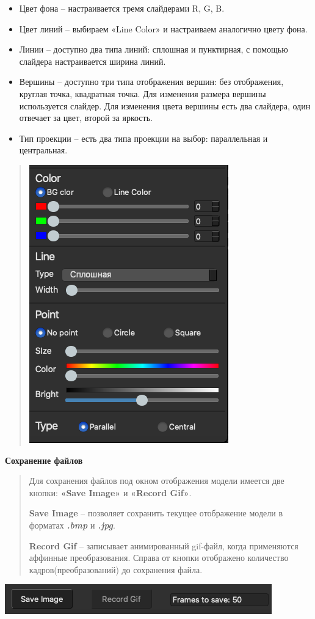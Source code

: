 \documentclass[
]{article}
\begin{document}
\begin{itemize}
\item
  Цвет фона -- настраивается тремя слайдерами R, G, B.
\item
  Цвет линий -- выбираем «Line Color» и настраиваем аналогично цвету
  фона.
\item
  Линии -- доступно два типа линий: сплошная и пунктирная, с помощью
  слайдера настраивается ширина линий.
\item
  Вершины -- доступно три типа отображения вершин: без отображения,
  круглая точка, квадратная точка. Для изменения размера вершины
  используется слайдер. Для изменения цвета вершины есть два слайдера,
  один отвечает за цвет, второй за яркость.
\item
  Тип проекции -- есть два типа проекции на выбор: параллельная и
  центральная.
\end{itemize}

\begin{quote}
  \begin{center}
\includegraphics[bb=0 0 480 360]{media/image4.png}
  \end{center}
\end{quote}
\pagebreak[10]
\huge
\textbf{Сохранение файлов}
\newline
\LARGE
\begin{quote}
Для сохранения файлов под окном отображения модели имеется две кнопки:
\textbf{«Save Image»} и \textbf{«Record Gif»}.

\textbf{Save Image} -- позволяет сохранить текущее отображение модели в
форматах \emph{\textbf{.bmp}} и \emph{\textbf{.jpg}}.

\textbf{Record Gif} -- записывает анимированный gif-файл, когда
применяются аффинные преобразования. Справа от кнопки отображено
количество кадров(преобразований) до сохранения файла.
\end{quote}
\includegraphics[bb=0 0 180 60]{media/image5.png}
\end{document}
